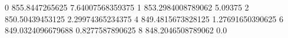0 855.8447265625 7.64007568359375
1 853.2984008789062 5.09375
2 850.50439453125 2.29974365234375
4 849.4815673828125 1.27691650390625
6 849.0324096679688 0.8277587890625
8 848.2046508789062 0.0

